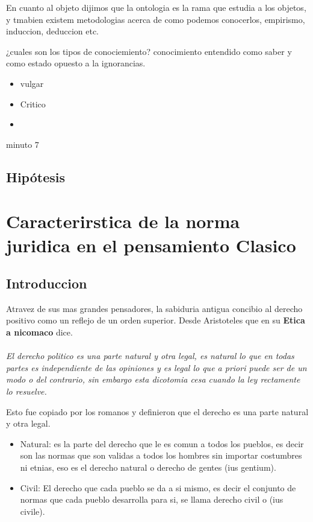 \documentclass[12pt]{book}
\begin{document}
En cuanto al objeto dijimos que la ontologia es la rama que estudia a los objetos, y tmabien existem metodologias acerca de como podemos conocerlos, empirismo, induccion, deduccion etc.

¿cuales son los tipos de conociemiento? conocimiento entendido como saber y como estado opuesto a la ignorancias.

\begin{itemize}
\item vulgar
\item Critico
\item  
\end{itemize}

minuto 7

\section{Hipótesis}
\chapter{Caracterirstica de la norma juridica en el pensamiento Clasico}

\section{Introduccion}
Atravez de sus mas grandes pensadores, la sabiduria antigua concibio al derecho positivo como un reflejo de un orden superior.
Desde Aristoteles que en su \textbf{Etica a nicomaco} dice.
\\
\\
\textit{El derecho politico es una parte natural y otra legal, es natural lo que en todas partes es independiente de las opiniones y es legal lo que a priori puede ser de un modo o del contrario, sin embargo esta dicotomia cesa cuando la ley rectamente lo resuelve.}

Esto fue copiado por los romanos y definieron que el derecho es una parte natural y otra legal.
\begin{itemize}
\item Natural: es la parte del derecho que le es comun a todos los pueblos, es decir son las normas que son validas a todos los hombres sin importar costumbres ni etnias, eso es el derecho natural o derecho de gentes (ius gentium).
\item Civil: El derecho que cada pueblo se da a si mismo, es decir el conjunto de normas que cada pueblo desarrolla para si, se llama derecho civil o (ius civile).
\end{itemize}
\end{document}
